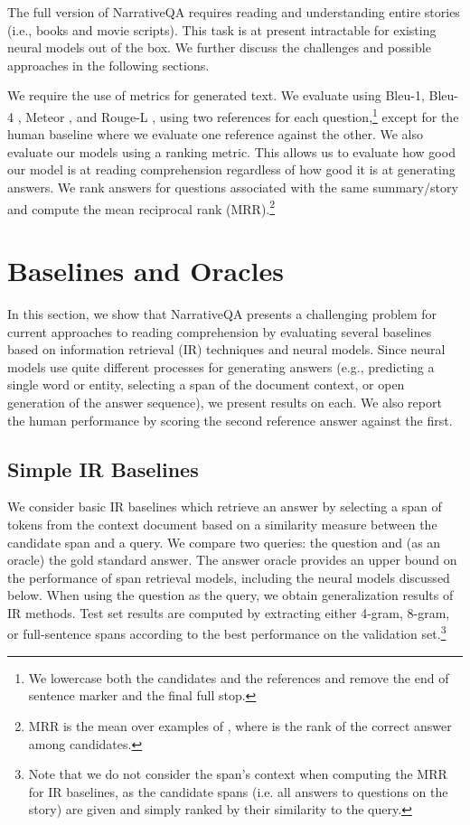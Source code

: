 \documentclass[11pt,letterpaper]{article}
\begin{document}
The full version of NarrativeQA requires reading and understanding entire stories (i.e., books and movie scripts).
This task is at present intractable for existing neural models out of the box. We further discuss the challenges and possible approaches in the following sections.



We require the use of metrics for generated text.
We evaluate using \mbox{Bleu-1}, \mbox{Bleu-4} \cite{papineni2002bleu}, Meteor \cite{denkowski:lavie:meteor-wmt:2011}, and \mbox{Rouge-L} \cite{Rouge}, using two references for each question,\footnote{We lowercase both the candidates and the references and remove the end of sentence marker and the final full stop.} except for the human baseline where we evaluate one reference against the other.
We also evaluate our models using a ranking metric. This allows us to evaluate how good our model is at reading comprehension regardless of how good it is at generating answers. We rank answers for questions associated with the same summary/story and compute the mean reciprocal rank (MRR).\footnote{MRR is the mean over examples of , where  is the rank of the correct answer among candidates.}




\section{Baselines and Oracles}
\label{sec:baselinebenchmarks}

In this section, we show that NarrativeQA presents a challenging problem for current approaches to reading comprehension by evaluating several baselines based on information retrieval (IR) techniques and neural models. Since neural models use quite different processes for generating answers (e.g., predicting a single word or entity, selecting a span of the document context, or open generation of the answer sequence), we present results on each. We also report the human performance by scoring the second reference answer against the first.



\subsection{Simple IR Baselines}
\label{sec:ir_baselines}

We consider basic IR baselines which retrieve an answer by selecting a span of tokens from the context document based on a similarity measure between the candidate span and a query. We compare two queries: the question and (as an oracle) the gold standard answer. The answer oracle provides an upper bound on the performance of span retrieval models, including the neural models discussed below.
When using the question as the query, we obtain generalization results of IR methods. Test set results are computed by extracting either 4-gram, 8-gram, or full-sentence spans according to the best performance on the validation set.\footnote{Note that we do not consider the span's context when computing the MRR for IR baselines, as the candidate spans (i.e. all answers to questions on the story) are given and simply ranked by their similarity to the query.}
\end{document}
